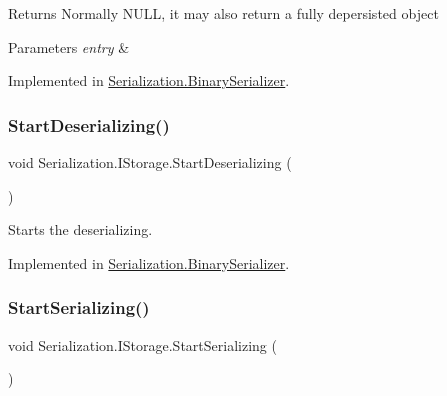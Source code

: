 \begin{DoxyReturn}{Returns}
Normally N\+U\+LL, it may also return a fully depersisted object
\end{DoxyReturn}

\begin{DoxyParams}{Parameters}
{\em entry} & \\
\hline
\end{DoxyParams}


Implemented in \hyperlink{class_serialization_1_1_binary_serializer_a9b376977bd19d9bfef1fce28e110220a}{Serialization.\+Binary\+Serializer}.

\mbox{\label{interface_serialization_1_1_i_storage_ab0432907fec979aa0832b659b4bd8d67}} 
\subsubsection{\texorpdfstring{Start\+Deserializing()}{StartDeserializing()}\hspace{0.1cm}{\footnotesize\ttfamily [2/2]}}
{\footnotesize\ttfamily void Serialization.\+I\+Storage.\+Start\+Deserializing (\begin{DoxyParamCaption}{ }\end{DoxyParamCaption})}



Starts the deserializing. 



Implemented in \hyperlink{class_serialization_1_1_binary_serializer_a379a76963492f1fb3a8168e794148683}{Serialization.\+Binary\+Serializer}.

\mbox{\label{interface_serialization_1_1_i_storage_a0f040f49872c3bf4ba92a350494e45af}} 
\subsubsection{\texorpdfstring{Start\+Serializing()}{StartSerializing()}\hspace{0.1cm}{\footnotesize\ttfamily [1/2]}}
{\footnotesize\ttfamily void Serialization.\+I\+Storage.\+Start\+Serializing (\begin{DoxyParamCaption}{ }\end{DoxyParamCaption})}



